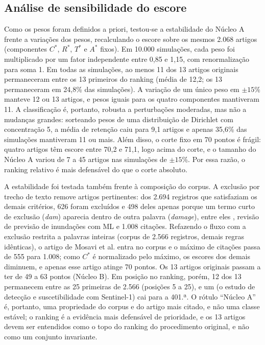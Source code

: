 \subsection{Análise de sensibilidade do escore}
\label{sec:art-sensibilidade}

Como os pesos foram definidos a priori, testou-se a estabilidade do Núcleo A frente a variações dos pesos, recalculando o escore sobre os mesmos 2.068 artigos (componentes $C^*$, $R^*$, $T^*$ e $A^*$ fixos). Em 10.000 simulações, cada peso foi multiplicado por um fator independente entre 0,85 e 1,15, com renormalização para soma 1. Em todas as simulações, ao menos 11 dos 13 artigos originais permaneceram entre os 13 primeiros do ranking (média de 12,2; os 13 permaneceram em 24,8\% das simulações). A variação de um único peso em $\pm 15\%$ manteve 12 ou 13 artigos, e pesos iguais para os quatro componentes mantiveram 11. A classificação é, portanto, robusta a perturbações moderadas, mas não a mudanças grandes: sorteando pesos de uma distribuição de Dirichlet com concentração 5, a média de retenção caiu para 9,1 artigos e apenas 35,6\% das simulações mantiveram 11 ou mais. Além disso, o corte fixo em 70 pontos é frágil: quatro artigos têm escore entre 70,2 e 71,1, logo acima do corte, e o tamanho do Núcleo A variou de 7 a 45 artigos nas simulações de $\pm 15\%$. Por essa razão, o ranking relativo é mais defensável do que o corte absoluto.

A estabilidade foi testada também frente à composição do corpus. A exclusão por trecho de texto remove artigos pertinentes: dos 2.694 registros que satisfaziam os demais critérios, 626 foram excluídos e 498 deles apenas porque um termo curto de exclusão (\textit{dam}) aparecia dentro de outra palavra (\textit{damage}), entre eles , revisão de previsão de inundações com ML e 1.008 citações. Refazendo o fluxo com a exclusão restrita a palavras inteiras (corpus de 2.566 registros, demais regras idênticas), o artigo de Mosavi et al. entra no corpus e o máximo de citações passa de 555 para 1.008; como $C^{*}$ é normalizado pelo máximo, os escores dos demais diminuem, e apenas esse artigo atinge 70 pontos. Os 13 artigos originais passam a ter de 49 a 63 pontos (Núcleo B). Em posição no ranking, porém, 12 dos 13 permanecem entre as 25 primeiras de 2.566 (posições 5 a 25), e um (o estudo de detecção e suscetibilidade com Sentinel-1) cai para a 401.ª. O rótulo ``Núcleo A'' é, portanto, uma propriedade do corpus e do artigo mais citado, e não uma classe estável; o ranking é a evidência mais defensável de prioridade, e os 13 artigos devem ser entendidos como o topo do ranking do procedimento original, e não como um conjunto invariante.

